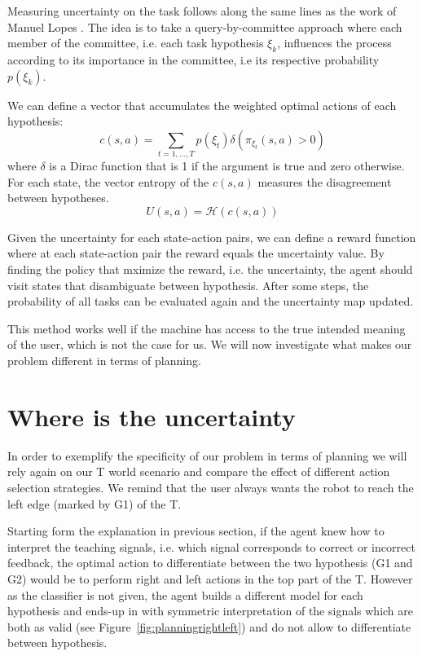 Measuring uncertainty on the task follows along the same lines as the work of Manuel Lopes \cite{lopes2009active, macl09airl}. The idea is to take a query-by-committee approach where each member of the committee, i.e. each task hypothesis $\xi_k$, influences the process according to its importance in the committee, i.e its respective probability $p(\xi_k)$. 

We can define a vector that accumulates the weighted optimal actions of each hypothesis: 
%
\[
c(s,a) = \sum_{t = 1, \ldots, T} p(\xi_t) \delta(\pi_{\xi_t}(s,a) > 0)
\]
%
where $\delta$ is a Dirac function that is 1 if the argument is true and zero otherwise. For each state, the vector entropy of the $c(s,a)$ measures the disagreement between hypotheses.
%
\[
U(s,a) = \mathcal{H}(c(s,a))
\]
%

Given the uncertainty for each state-action pairs, we can define a reward function where at each state-action pair the reward equals the uncertainty value. By finding the policy that mximize the reward, i.e. the uncertainty, the agent should visit states that disambiguate between hypothesis. After some steps, the probability of all tasks can be evaluated again and the uncertainty map updated.

This method works well if the machine has access to the true intended meaning of the user, which is not the case for us. We will now investigate what makes our problem different in terms of planning.

\section{Where is the uncertainty}
\label{chapter:planning:where}


In order to exemplify the specificity of our problem in terms of planning we will rely again on our T world scenario and compare the effect of different action selection strategies. We remind that the user always wants the robot to reach the left edge (marked by G1) of the T.


Starting form the explanation in previous section, if the agent knew how to interpret the teaching signals, i.e. which signal corresponds to correct or incorrect feedback, the optimal action to differentiate between the two hypothesis (G1 and G2) would be to perform right and left actions in the top part of the T. However as the classifier is not given, the agent builds a different model for each hypothesis and ends-up in with symmetric interpretation of the signals which are both as valid (see Figure~\ref{fig:planningrightleft}) and do not allow to differentiate between hypothesis.

